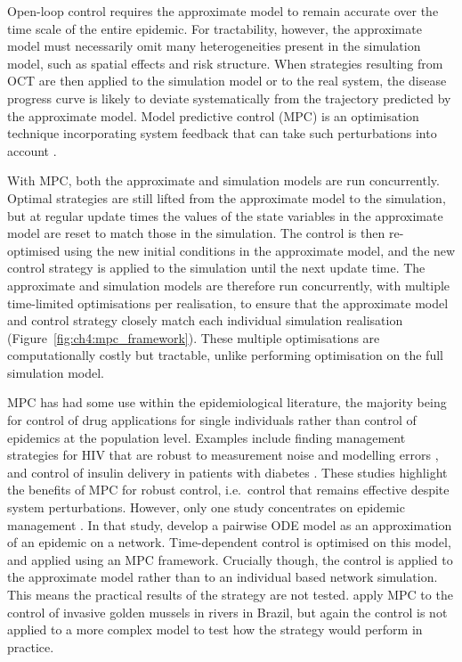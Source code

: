 Open-loop control requires the approximate model to remain accurate over the time scale of the entire epidemic. For tractability, however, the approximate model must necessarily omit many heterogeneities present in the simulation model, such as spatial effects and risk structure. When strategies resulting from OCT are then applied to the simulation model or to the real system, the disease progress curve is likely to deviate systematically from the trajectory predicted by the approximate model. Model predictive control (MPC) is an optimisation technique incorporating system feedback that can take such perturbations into account \citep{camacho_model_2012, lee_model_2011}.

With MPC, both the approximate and simulation models are run concurrently. Optimal strategies are still lifted from the approximate model to the simulation, but at regular update times the values of the state variables in the approximate model are reset to match those in the simulation. The control is then re-optimised using the new initial conditions in the approximate model, and the new control strategy is applied to the simulation until the next update time. The approximate and simulation models are therefore run concurrently, with multiple time-limited optimisations per realisation, to ensure that the approximate model and control strategy closely match each individual simulation realisation (Figure~\ref{fig:ch4:mpc_framework}). These multiple optimisations are computationally costly but tractable, unlike performing optimisation on the full simulation model.

MPC has had some use within the epidemiological literature, the majority being for control of drug applications for single individuals rather than control of epidemics at the population level. Examples include finding management strategies for HIV that are robust to measurement noise and modelling errors \citep{zurakowski_model_2006, david_receding_2011}, and control of insulin delivery in patients with diabetes \citep{hovorka_nonlinear_2004}. These studies highlight the benefits of MPC for robust control, i.e.\ control that remains effective despite system perturbations. However, only one study concentrates on epidemic management \citep{selley_dynamic_2015}. In that study, \citeauthor{selley_dynamic_2015} develop a pairwise ODE model as an approximation of an epidemic on a network. Time-dependent control is optimised on this model, and applied using an MPC framework. Crucially though, the control is applied to the approximate model rather than to an individual based network simulation. This means the practical results of the strategy are not tested. \citet{de_model_2019} apply MPC to the control of invasive golden mussels in rivers in Brazil, but again the control is not applied to a more complex model to test how the strategy would perform in practice.

